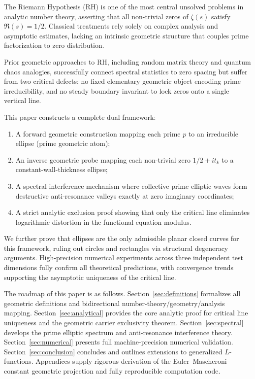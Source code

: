 \documentclass[10pt,reqno]{article}
\begin{document}
The Riemann Hypothesis (RH) is one of the most central unsolved problems in analytic number theory, asserting that all non-trivial zeros of $\zeta(s)$ satisfy $\Re(s)=1/2$. Classical treatments rely solely on complex analysis and asymptotic estimates, lacking an intrinsic geometric structure that couples prime factorization to zero distribution.

Prior geometric approaches to RH, including random matrix theory and quantum chaos analogies, successfully connect spectral statistics to zero spacing but suffer from two critical defects: no fixed elementary geometric object encoding prime irreducibility, and no steady boundary invariant to lock zeros onto a single vertical line.

This paper constructs a complete dual framework:
\begin{enumerate}
\item A forward geometric construction mapping each prime $p$ to an irreducible ellipse (prime geometric atom);
\item An inverse geometric probe mapping each non-trivial zero $1/2+it_k$ to a constant-wall-thickness ellipse;
\item A spectral interference mechanism where collective prime elliptic waves form destructive anti-resonance valleys exactly at zero imaginary coordinates;
\item A strict analytic exclusion proof showing that only the critical line eliminates logarithmic distortion in the functional equation modulus.
\end{enumerate}

We further prove that ellipses are the only admissible planar closed curves for this framework, ruling out circles and rectangles via structural degeneracy arguments. High-precision numerical experiments across three independent test dimensions fully confirm all theoretical predictions, with convergence trends supporting the asymptotic uniqueness of the critical line.

The roadmap of this paper is as follows. Section~\ref{sec:definitions} formalizes all geometric definitions and bidirectional number-theory/geometry/analysis mapping. Section~\ref{sec:analytical} provides the core analytic proof for critical line uniqueness and the geometric carrier exclusivity theorem. Section~\ref{sec:spectral} develops the prime elliptic spectrum and anti-resonance interference theory. Section~\ref{sec:numerical} presents full machine-precision numerical validation. Section~\ref{sec:conclusion} concludes and outlines extensions to generalized $L$-functions. Appendices supply rigorous derivation of the Euler--Mascheroni constant geometric projection and fully reproducible computation code.
\end{document}
